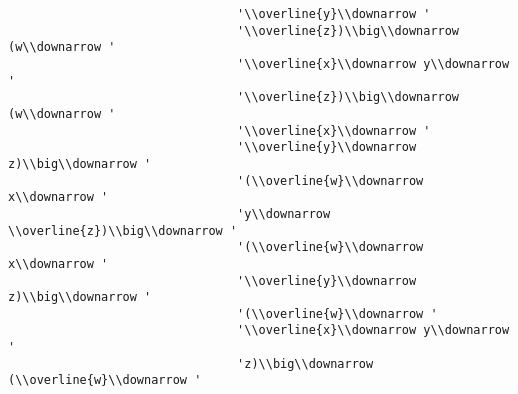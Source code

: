 \begin{verbatim}
                                '\\overline{y}\\downarrow '
                                '\\overline{z})\\big\\downarrow (w\\downarrow '
                                '\\overline{x}\\downarrow y\\downarrow '
                                '\\overline{z})\\big\\downarrow (w\\downarrow '
                                '\\overline{x}\\downarrow '
                                '\\overline{y}\\downarrow z)\\big\\downarrow '
                                '(\\overline{w}\\downarrow x\\downarrow '
                                'y\\downarrow \\overline{z})\\big\\downarrow '
                                '(\\overline{w}\\downarrow x\\downarrow '
                                '\\overline{y}\\downarrow z)\\big\\downarrow '
                                '(\\overline{w}\\downarrow '
                                '\\overline{x}\\downarrow y\\downarrow '
                                'z)\\big\\downarrow (\\overline{w}\\downarrow '

\end{verbatim}
